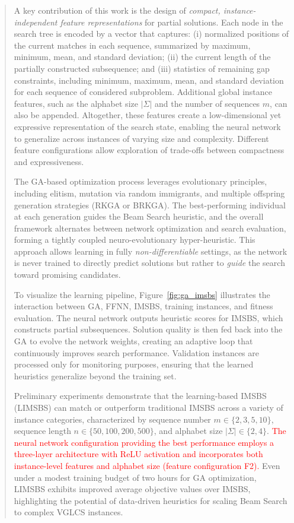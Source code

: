\documentclass[runningheads]{llncs}
\begin{document}
\begin{abstract}
    	A key contribution of this work is the design of \textit{compact, instance-independent feature representations} for partial solutions. Each node in the search tree is encoded by a vector that captures: (i) normalized positions of the current matches in each sequence, summarized by maximum, minimum, mean, and standard deviation; (ii) the current length of the partially constructed subsequence; and (iii) statistics of remaining gap constraints, including minimum, maximum, mean, and standard deviation for each sequence of considered subproblem. Additional global instance features, such as the alphabet size $|\Sigma|$ and the number of sequences $m$, can also be appended. Altogether, these features create a low-dimensional yet expressive representation of the search state, enabling the neural network to generalize across instances of varying size and complexity. Different feature configurations allow exploration of trade-offs between compactness and expressiveness.
    	
    	The GA-based optimization process leverages evolutionary principles, including elitism, mutation via random immigrants, and multiple offspring generation strategies (RKGA or BRKGA). The best-performing individual at each generation guides the Beam Search heuristic, and the overall framework alternates between network optimization and search evaluation, forming a tightly coupled neuro-evolutionary hyper-heuristic. This approach allows learning in fully \textit{non-differentiable} settings, as the network is never trained to directly predict solutions but rather to \textit{guide} the search toward promising candidates.  
    	
    	To visualize the learning pipeline, Figure~\ref{fig:ga_imsbs} illustrates the interaction between GA, FFNN, IMSBS, training instances, and fitness evaluation. The neural network outputs heuristic scores for IMSBS, which constructs partial subsequences. Solution quality is then fed back into the GA to evolve the network weights, creating an adaptive loop that continuously improves search performance. Validation instances are processed only for monitoring purposes, ensuring that the learned heuristics generalize beyond the training set.
    	
    	Preliminary experiments demonstrate that the learning-based IMSBS (LIMSBS) can match or outperform traditional IMSBS across a variety of instance categories, characterized by sequence number $m \in \{2,3,5,10\}$, sequence length $n \in \{50,100,200,500\}$, and alphabet size $|\Sigma| \in \{2,4\}$. 	\textcolor{red}{The neural network configuration providing the best performance employs a three-layer architecture with ReLU activation and incorporates both instance-level features and alphabet size (feature configuration F2).} Even under a modest training budget of two hours for GA optimization, LIMSBS exhibits improved average objective values over IMSBS, highlighting the potential of data-driven heuristics for scaling Beam Search to complex VGLCS instances.
    	

\end{abstract}
\end{document}
